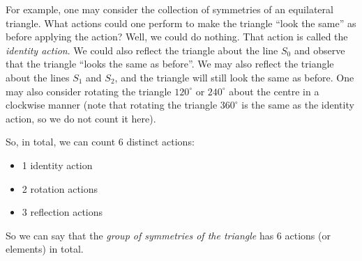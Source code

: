 \begin{figure}
    \centering
\end{figure}

For example, one may consider the collection of symmetries of an equilateral triangle. What actions could one perform to make the triangle ``look the same'' as before applying the action? Well, we could do nothing. That action is called the \textit{identity action}. We could also reflect the triangle about the line $S_0$ and observe that the triangle ``looks the same as before''. We may also reflect the triangle about the lines $S_1$ and $S_2$, and the triangle will still look the same as before. One may also consider rotating the triangle $120^\circ$ or $240^\circ$ about the centre in a clockwise manner (note that rotating the triangle $360^\circ$ is the same as the identity action, so we do not count it here).

So, in total, we can count 6 distinct actions:
\begin{itemize}
    \item 1 identity action
    \item 2 rotation actions
    \item 3 reflection actions
\end{itemize}
So we can say that the \textit{group of symmetries of the triangle} has 6 actions (or elements) in total.

\begin{figure}
    \centering
\end{figure}

